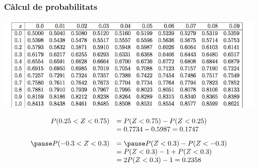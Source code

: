 \documentclass[12pt,t]{beamer}\usepackage[]{graphicx}\usepackage[]{color}
\renewcommand{\leq}{\leqslant}
\renewcommand{\geq}{\geqslant}
\theoremstyle{plain}
\theoremstyle{definition}
\begin{document}
\begin{frame}
\frametitle{Càlcul de probabilitats}
\vspace*{-1cm}

\begin{center}
\hspace*{-0.4cm}\includegraphics[width=1.1\linewidth]{tabla.jpg}
\end{center}
$$
\begin{array}{rl}
P(0.25<Z<0.75) & =P(Z<0.75)-P(Z<0.25)\\ & =0.7734-0.5987=0.1747\\[2ex]\pause
P(-0.3<Z<0.3) & =\pause P(Z<0.3)-P(Z<-0.3)\\ & =P(Z<0.3)-1+P(Z<0.3)\\ & =2P(Z<0.3)-1=0.2358
\end{array}
$$
\end{frame}


%
%
\end{document}
